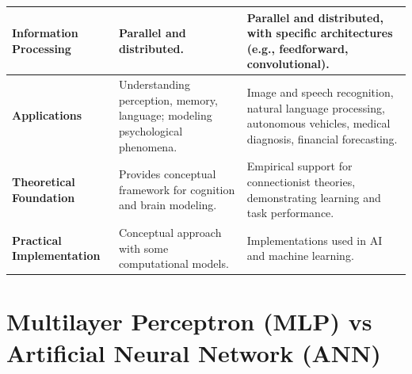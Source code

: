 \begin{customTableWrapper}{1.5}
\begin{longtable}{|>{\raggedright\arraybackslash}p{3cm}|>{\raggedright\arraybackslash}p{6cm}|>{\raggedright\arraybackslash}p{6cm}|}
    \textbf{Information Processing} & Parallel and distributed. & Parallel and distributed, with specific architectures (e.g., feedforward, convolutional). \\
    \hline
    
    \textbf{Applications} & Understanding perception, memory, language; modeling psychological phenomena. & Image and speech recognition, natural language processing, autonomous vehicles, medical diagnosis, financial forecasting. \\
    \hline
    
    \textbf{Theoretical Foundation} & Provides conceptual framework for cognition and brain modeling. & Empirical support for connectionist theories, demonstrating learning and task performance. \\
    \hline

    \textbf{Practical Implementation} & Conceptual approach with some computational models. & Implementations used in AI and machine learning. \\
    \hline
\end{longtable}
\end{customTableWrapper}


\section{Multilayer Perceptron (MLP) vs Artificial Neural Network (ANN)}\label{mlp vs ann}

